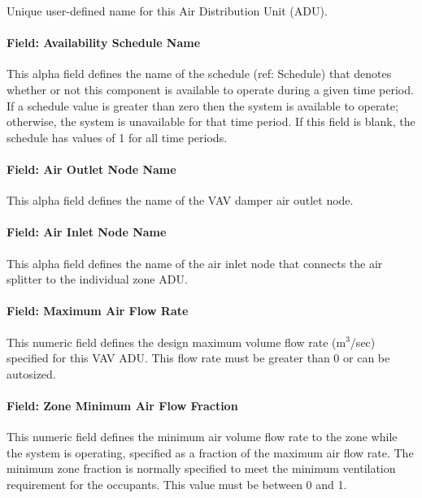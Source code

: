Unique user-defined name for this Air Distribution Unit (ADU).

\paragraph{Field: Availability Schedule Name}\label{field-availability-schedule-name-6}

This alpha field defines the name of the schedule (ref: Schedule) that denotes whether or not this component is available to operate during a given time period. If a schedule value is greater than zero then the system is available to operate; otherwise, the system is unavailable for that time period. If this field is blank, the schedule has values of 1 for all time periods.

\paragraph{Field: Air Outlet Node Name}\label{field-air-outlet-node-name-5}

This alpha field defines the name of the VAV damper air outlet node.

\paragraph{Field: Air Inlet Node Name}\label{field-air-inlet-node-name-5}

This alpha field defines the name of the air inlet node that connects the air splitter to the individual zone ADU.

\paragraph{Field: Maximum Air Flow Rate}\label{field-maximum-air-flow-rate-5}

This numeric field defines the design maximum volume flow rate (m\(^{3}\)/sec) specified for this VAV ADU. This flow rate must be greater than 0 or can be autosized.

\paragraph{Field: Zone Minimum Air Flow Fraction}\label{field-zone-minimum-air-flow-fraction-2}

This numeric field defines the minimum air volume flow rate to the zone while the system is operating, specified as a fraction of the maximum air flow rate. The minimum zone fraction is normally specified to meet the minimum ventilation requirement for the occupants. This value must be between 0 and 1.

